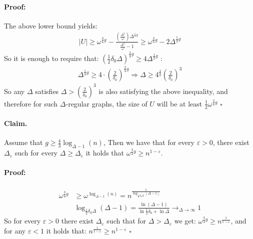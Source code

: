 \documentclass{article}
\begin{document}
\begin{multicols*}{2}
\paragraph{Proof:} The above lower bound yields: 
\begin{equation*}
  \begin{split}
    |U| \ge \omega^{\frac{3}{4}g} -  \frac{\left( \frac{\Delta^{2}}{\omega} \right)\Delta^{\frac{1}{2}g}  }{\frac{\Delta^{2}}{\omega}-1} \ge \omega^{\frac{3}{4}g} -  2 \Delta^{\frac{1}{2}g}  
  \end{split}
\end{equation*}
So it is enough to require that: $\left( \frac{1}{2}\delta_{0}\Delta  \right)^{\frac{3}{4}g} \ge 4 \Delta^{\frac{1}{2}g}$ :  
\begin{equation*}
  \begin{split}
    \Delta^{\frac{1}{4}g}\ge 4\cdot \left( \frac{2}{\delta_{0}} \right)^{\frac{3}{4}g} \Rightarrow\Delta \ge  4^{\frac{4}{g}} \left( \frac{2}{\delta_{0}} \right)^{3} 
  \end{split}
\end{equation*} So any $\Delta$ satisfies $\Delta> \left( \frac{2}{\delta_0} \right)^{3}$ is also satisfying the above inequality, and therefore for such $\Delta$-regular graphs, the size of $U$ will be at least $\frac{1}{2}\omega^{\frac{3}{4}g}$ $\square$   

\paragraph{Claim.} Assume that $ g \ge \frac{4}{3} \log_{\Delta -1 }\left( n \right) $, Then we have that for every $\varepsilon >0 $,  there exist $\Delta_{\varepsilon}$  such for every $\Delta \ge \Delta_{\varepsilon}$  it holds that $ \omega^{\frac{3}{4}g} \ge n^{1-\varepsilon}$.
\paragraph{Proof:}

\begin{equation*}
  \begin{split}
    \omega^{\frac{3}{4}g}&\ge \omega^{\log_{\Delta-1}\left( n \right)} = n^{\frac{1}{\log_{\frac{1}{2}\delta_{0}\Delta}\left( \Delta -1 \right)}} \\ 
    & \log_{\frac{1}{2}\delta_{0}\Delta}\left( \Delta -1 \right) = \frac{\ln\left( \Delta-1 \right)}{\ln\frac{1}{2}\delta_{0}+ \ln \Delta} \rightarrow_{\Delta\rightarrow \infty} 1
  \end{split}
\end{equation*} So for every $\varepsilon >0 $ there exist $\Delta_{\varepsilon}$ such that for $\Delta > \Delta_{\varepsilon}$ we get: $\omega^{\frac{3}{4}g} \ge n^{\frac{1}{1-\varepsilon}}$, and for any $\varepsilon < 1$ it holds that: $ n^{\frac{1}{1-\varepsilon}}\ge n^{1-\varepsilon}$ $\square$


\end{multicols*}
\end{document}
